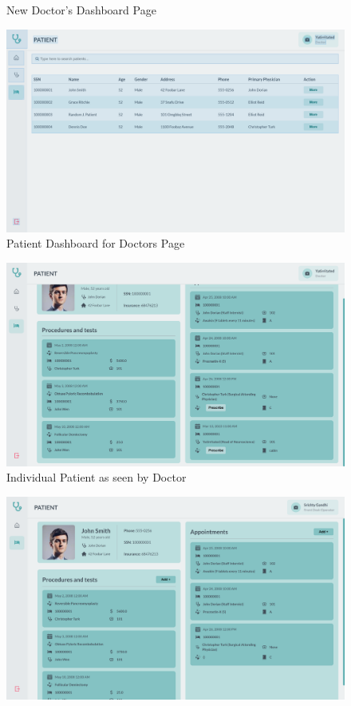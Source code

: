 \documentclass[12pt,a4paper]{article}
\begin{document}
{\begin{enumerate}
\begin{figure}[htp]
    \caption{New Doctor's Dashboard Page}
\end{figure}
\begin{figure}[htp]
    \centering
    \includegraphics[width=1\textwidth]{patient_lookup.png}
    \caption{Patient Dashboard for Doctors Page}
\end{figure}
\begin{figure}[htp]
    \centering
    \includegraphics[width=1\textwidth]{pat_doc.png}
    \caption{Individual Patient as seen by Doctor}
\end{figure}
\begin{figure}[htp]
    \centering
    \includegraphics[width=1\textwidth]{patient_info.png}

\end{figure}
\end{enumerate}}
\end{document}
